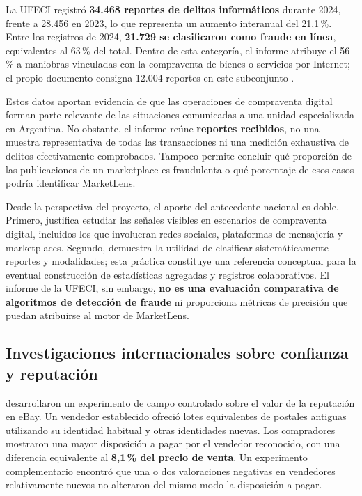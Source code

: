 La UFECI registró \textbf{34.468 reportes de delitos informáticos} durante 2024, frente a 28.456 en 2023, lo que representa un aumento interanual del 21,1\,\%. Entre los registros de 2024, \textbf{21.729 se clasificaron como fraude en línea}, equivalentes al 63\,\% del total. Dentro de esta categoría, el informe atribuye el 56\,\% a maniobras vinculadas con la compraventa de bienes o servicios por Internet; el propio documento consigna 12.004 reportes en este subconjunto \parencite{ml-ufeci-2025}.

Estos datos aportan evidencia de que las operaciones de compraventa digital forman parte relevante de las situaciones comunicadas a una unidad especializada en Argentina. No obstante, el informe reúne \textbf{reportes recibidos}, no una muestra representativa de todas las transacciones ni una medición exhaustiva de delitos efectivamente comprobados. Tampoco permite concluir qué proporción de las publicaciones de un marketplace es fraudulenta o qué porcentaje de esos casos podría identificar MarketLens.

Desde la perspectiva del proyecto, el aporte del antecedente nacional es doble. Primero, justifica estudiar las señales visibles en escenarios de compraventa digital, incluidos los que involucran redes sociales, plataformas de mensajería y marketplaces. Segundo, demuestra la utilidad de clasificar sistemáticamente reportes y modalidades; esta práctica constituye una referencia conceptual para la eventual construcción de estadísticas agregadas y registros colaborativos. El informe de la UFECI, sin embargo, \textbf{no es una evaluación comparativa de algoritmos de detección de fraude} ni proporciona métricas de precisión que puedan atribuirse al motor de MarketLens.

\subsection{Investigaciones internacionales sobre confianza y reputación}\label{subsec:ml-reputacion-investigaciones}

\textcite{ml-resnick-2006} desarrollaron un experimento de campo controlado sobre el valor de la reputación en eBay. Un vendedor establecido ofreció lotes equivalentes de postales antiguas utilizando su identidad habitual y otras identidades nuevas. Los compradores mostraron una mayor disposición a pagar por el vendedor reconocido, con una diferencia equivalente al \textbf{8,1\,\% del precio de venta}. Un experimento complementario encontró que una o dos valoraciones negativas en vendedores relativamente nuevos no alteraron del mismo modo la disposición a pagar.

